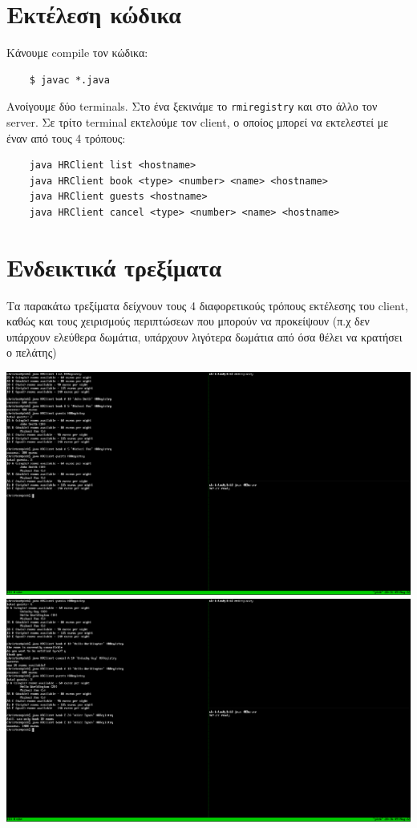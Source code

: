 \documentclass{article}
\begin{document}
\section{Εκτέλεση κώδικα}

Κάνουμε compile τον κώδικα:

\begin{lstlisting}
	$ javac *.java
\end{lstlisting}

Ανοίγουμε δύο terminals. Στο ένα ξεκινάμε το \lstinline{rmiregistry} και στο
άλλο τον server. Σε τρίτο terminal εκτελούμε τον client, ο οποίος μπορεί
να εκτελεστεί με έναν από τους 4 τρόπους:

\begin{lstlisting}
	java HRClient list <hostname>
	java HRClient book <type> <number> <name> <hostname>
	java HRClient guests <hostname>
	java HRClient cancel <type> <number> <name> <hostname>
\end{lstlisting}

\section{Ενδεικτικά τρεξίματα}

Τα παρακάτω τρεξίματα δείχνουν τους 4 διαφορετικούς τρόπους εκτέλεσης του
client, καθώς και τους χειρισμούς περιπτώσεων που μπορούν να προκείψουν (π.χ
δεν υπάρχουν ελεύθερα δωμάτια, υπάρχουν λιγότερα δωμάτια από όσα θέλει να
κρατήσει ο πελάτης)

\includegraphics[width=\linewidth]{res/run1.png}
\includegraphics[width=\linewidth]{res/run2.png}
\end{document}

